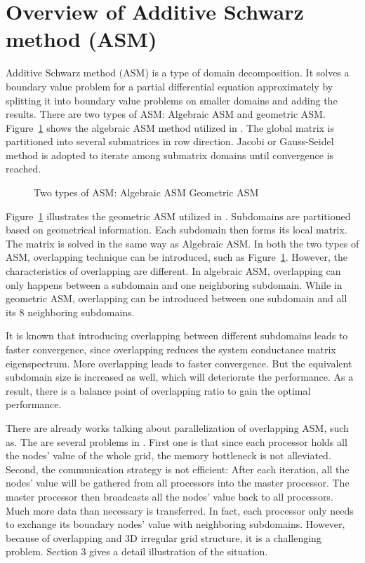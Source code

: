 \documentclass{sig-alternate}
\begin{document}
\section{Overview of Additive Schwarz method (ASM)}	
	Additive Schwarz method (ASM) is a type of domain decomposition. It solves a boundary value problem for a partial 
	differential equation approximately by splitting it into boundary value problems on smaller domains and adding the results.
	There are two types of ASM: Algebraic ASM and geometric ASM. 
	Figure~\ref{Fig2} shows the algebraic ASM method utilized in \cite{kaisun}. The global matrix
	is partitioned into several submatrices in row direction. Jacobi or Gauss-Seidel method is adopted to iterate among 
	submatrix domains until convergence is reached.
	\begin{figure}[htbp]
	  \caption{Two types of ASM: 
	   Algebraic ASM
	   Geometric ASM}
	  \label{Fig2}
	\end{figure}
	Figure~\ref{Fig2} illustrates the geometric ASM utilized in \cite{Zhongyu}. Subdomains are partitioned based on
	geometrical information. Each subdomain then forms its local matrix. The matrix is
	solved in the same way as Algebraic ASM. In both the two types of ASM, overlapping technique can be introduced, such as 
	Figure~\ref{Fig2}. However, the characteristics of overlapping are different.
	In algebraic ASM, overlapping can only happens between a subdomain and one neighboring subdomain. While in 
	geometric ASM, overlapping can be introduced between one subdomain and all its 8 neighboring subdomains.
	
	It is known that introducing overlapping between different subdomains leads to faster convergence, 
	since overlapping reduces the system conductance matrix eigenspectrum\cite{Klawonn, Taopeng}. More overlapping leads to faster 
	convergence.
	But the equivalent subdomain size is increased as well, which will deteriorate the performance. As a result, there is a 
	balance point of overlapping ratio to gain the optimal performance.

	There are already works talking about parallelization of overlapping ASM, such as\cite{kaisun}. The are several problems in 
	\cite{kaisun}. First one is that since each processor holds all the nodes' value of the whole grid, the memory bottleneck
	is not alleviated. Second, the communication strategy is not efficient: After each iteration, all the
	nodes' value will be gathered from all processors into the master processor. The master processor then broadcasts all the nodes'
	value back to all processors. Much more
	data than necessary is transferred. In fact, each processor only needs to exchange its boundary nodes' value with neighboring 
	subdomains. However, because of overlapping and 3D irregular grid structure, it is a challenging problem. Section 3
	gives a detail illustration of the situation.
 
\end{document}
